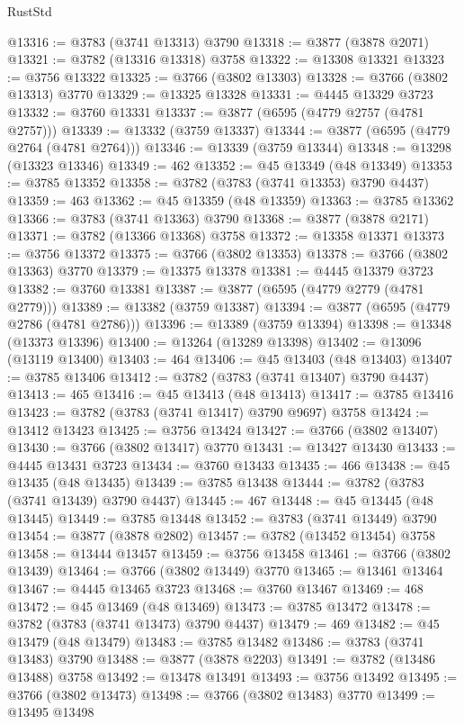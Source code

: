 \begin{lexlean}{RustStd}
\begin{coremodule}
@13316 := @3783 (@3741 @13313) @3790
@13318 := @3877 (@3878 @2071)
@13321 := @3782 (@13316 @13318) @3758
@13322 := @13308 @13321
@13323 := @3756 @13322
@13325 := @3766 (@3802 @13303)
@13328 := @3766 (@3802 @13313) @3770
@13329 := @13325 @13328
@13331 := @4445 @13329 @3723
@13332 := @3760 @13331
@13337 := @3877 (@6595 (@4779 @2757 (@4781 @2757)))
@13339 := @13332 (@3759 @13337)
@13344 := @3877 (@6595 (@4779 @2764 (@4781 @2764)))
@13346 := @13339 (@3759 @13344)
@13348 := @13298 (@13323 @13346)
@13349 := 462
@13352 := @45 @13349 (@48 @13349)
@13353 := @3785 @13352
@13358 := @3782 (@3783 (@3741 @13353) @3790 @4437)
@13359 := 463
@13362 := @45 @13359 (@48 @13359)
@13363 := @3785 @13362
@13366 := @3783 (@3741 @13363) @3790
@13368 := @3877 (@3878 @2171)
@13371 := @3782 (@13366 @13368) @3758
@13372 := @13358 @13371
@13373 := @3756 @13372
@13375 := @3766 (@3802 @13353)
@13378 := @3766 (@3802 @13363) @3770
@13379 := @13375 @13378
@13381 := @4445 @13379 @3723
@13382 := @3760 @13381
@13387 := @3877 (@6595 (@4779 @2779 (@4781 @2779)))
@13389 := @13382 (@3759 @13387)
@13394 := @3877 (@6595 (@4779 @2786 (@4781 @2786)))
@13396 := @13389 (@3759 @13394)
@13398 := @13348 (@13373 @13396)
@13400 := @13264 (@13289 @13398)
@13402 := @13096 (@13119 @13400)
@13403 := 464
@13406 := @45 @13403 (@48 @13403)
@13407 := @3785 @13406
@13412 := @3782 (@3783 (@3741 @13407) @3790 @4437)
@13413 := 465
@13416 := @45 @13413 (@48 @13413)
@13417 := @3785 @13416
@13423 := @3782 (@3783 (@3741 @13417) @3790 @9697) @3758
@13424 := @13412 @13423
@13425 := @3756 @13424
@13427 := @3766 (@3802 @13407)
@13430 := @3766 (@3802 @13417) @3770
@13431 := @13427 @13430
@13433 := @4445 @13431 @3723
@13434 := @3760 @13433
@13435 := 466
@13438 := @45 @13435 (@48 @13435)
@13439 := @3785 @13438
@13444 := @3782 (@3783 (@3741 @13439) @3790 @4437)
@13445 := 467
@13448 := @45 @13445 (@48 @13445)
@13449 := @3785 @13448
@13452 := @3783 (@3741 @13449) @3790
@13454 := @3877 (@3878 @2802)
@13457 := @3782 (@13452 @13454) @3758
@13458 := @13444 @13457
@13459 := @3756 @13458
@13461 := @3766 (@3802 @13439)
@13464 := @3766 (@3802 @13449) @3770
@13465 := @13461 @13464
@13467 := @4445 @13465 @3723
@13468 := @3760 @13467
@13469 := 468
@13472 := @45 @13469 (@48 @13469)
@13473 := @3785 @13472
@13478 := @3782 (@3783 (@3741 @13473) @3790 @4437)
@13479 := 469
@13482 := @45 @13479 (@48 @13479)
@13483 := @3785 @13482
@13486 := @3783 (@3741 @13483) @3790
@13488 := @3877 (@3878 @2203)
@13491 := @3782 (@13486 @13488) @3758
@13492 := @13478 @13491
@13493 := @3756 @13492
@13495 := @3766 (@3802 @13473)
@13498 := @3766 (@3802 @13483) @3770
@13499 := @13495 @13498

\end{coremodule}
\end{lexlean}
